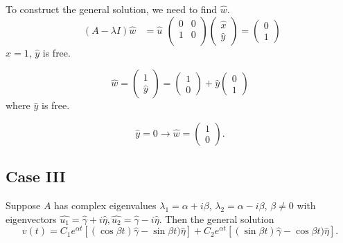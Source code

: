 \documentclass[12pt,twoside]{article}
\begin{document}
To construct the general solution, we need to find $\hat{w}$.
\begin{equation}
  \begin{aligned}
    (A-\lambda I)\hat{w}&=\hat{u}
  \end{aligned}
\begin{pmatrix}
    0 & 0 \\ 1 & 0 \\
  \end{pmatrix}
  \begin{pmatrix}
    \hat{x} \\ \hat{y}
  \end{pmatrix} =
  \begin{pmatrix}
    0 \\ 1
  \end{pmatrix}
\end{equation}
$\hat{x}=1$, $\hat{y}$ is free.

\begin{equation}
  \hat{w} =
  \begin{pmatrix}
    1 \\ \hat{y}
  \end{pmatrix} =
  \begin{pmatrix}
    1 \\ 0
  \end{pmatrix} +
  \hat{y}\begin{pmatrix}
    0 \\ 1
  \end{pmatrix}
\end{equation} where $\hat{y}$ is free.

\begin{equation}
  \hat{y} =0 \rightarrow \hat{w}=
  \begin{pmatrix}
    1 \\ 0
  \end{pmatrix}.
\end{equation}

\subsection{Case III}
Suppose $A$ has complex eigenvalues $\lambda_1=\alpha+i\beta$,
$\lambda_2=\alpha-i\beta$, $\beta\ne0$ with eigenvectors
$\hat{u_1}=\hat{\gamma}+i\hat{\eta}, \hat{u_2}=\hat{\gamma}-i\hat{\eta}$. Then
the general solution
\begin{equation}
  v(t) = C_1e^{\alpha t}[(\cos\beta t)\hat{\gamma} - \sin\beta t)\hat{\eta}] +
  C_2e^{\alpha t}[(\sin\beta t)\hat{\gamma} - \cos\beta t)\hat{\eta}].
\end{equation}
\end{document}
